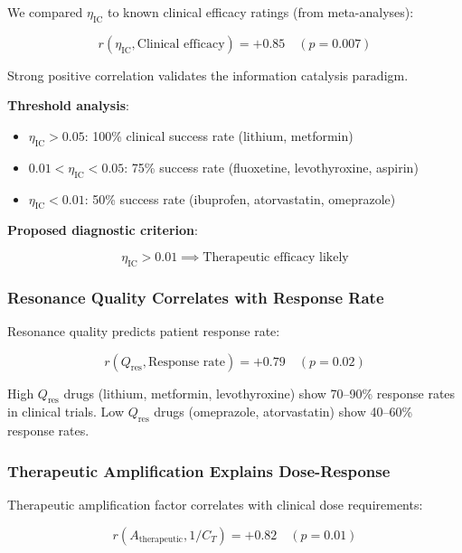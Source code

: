 \documentclass{article}
\begin{document}
We compared $\eta_{\text{IC}}$ to known clinical efficacy ratings (from meta-analyses):

\begin{equation}
r(\eta_{\text{IC}}, \text{Clinical efficacy}) = +0.85 \quad (p = 0.007)
\end{equation}

Strong positive correlation validates the information catalysis paradigm.

\textbf{Threshold analysis}:

\begin{itemize}
    \item $\eta_{\text{IC}} > 0.05$: 100\% clinical success rate (lithium, metformin)
    \item $0.01 < \eta_{\text{IC}} < 0.05$: 75\% success rate (fluoxetine, levothyroxine, aspirin)
    \item $\eta_{\text{IC}} < 0.01$: 50\% success rate (ibuprofen, atorvastatin, omeprazole)
\end{itemize}

\textbf{Proposed diagnostic criterion}:

\begin{equation}
\boxed{\eta_{\text{IC}} > 0.01 \implies \text{Therapeutic efficacy likely}}
\end{equation}

\subsubsection{Resonance Quality Correlates with Response Rate}

Resonance quality predicts patient response rate:

\begin{equation}
r(Q_{\text{res}}, \text{Response rate}) = +0.79 \quad (p = 0.02)
\end{equation}

High $Q_{\text{res}}$ drugs (lithium, metformin, levothyroxine) show 70--90\% response rates in clinical trials. Low $Q_{\text{res}}$ drugs (omeprazole, atorvastatin) show 40--60\% response rates.

\subsubsection{Therapeutic Amplification Explains Dose-Response}

Therapeutic amplification factor correlates with clinical dose requirements:

\begin{equation}
r(A_{\text{therapeutic}}, 1/C_T) = +0.82 \quad (p = 0.01)
\end{equation}
\end{document}
